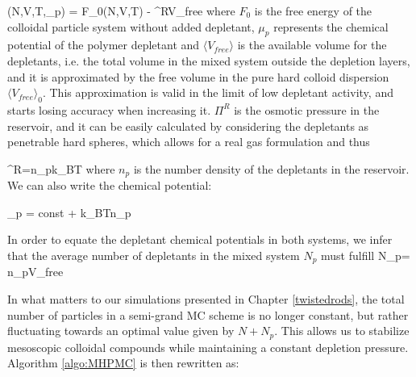 \beq
\Omega(N,V,T,\mu_p) = F_0(N,V,T) - \Pi^R\langle V_{free} \rangle
\eeq
where $F_0$ is the free energy of the colloidal particle system without added depletant, $\mu_p$ represents the chemical potential of the polymer depletant and $\langle V_{free} \rangle$ is the available volume for the depletants, i.e. the total volume in the mixed system outside the depletion layers, and it is approximated by the free volume in the pure hard colloid dispersion $\langle V_{free} \rangle_0$. This approximation is valid in the limit of low depletant activity, and starts losing accuracy when increasing it. $\Pi^R$ is the osmotic pressure in the reservoir, and it can be easily calculated by considering the depletants as penetrable hard spheres, which allows for a real gas formulation and thus

\beq
\Pi^R=n_pk_BT
\eeq
where $n_p$ is the number density of the depletants in the reservoir. We can also write the chemical potential:

\beq
\mu_p = \textrm{const} + k_BT\ln n_p
\eeq

In order to equate the depletant chemical potentials in both systems, we infer that the average number of depletants in the mixed system $N_p$ must fulfill
\beq
N_p= n_p\langle V_{free} \rangle
\eeq

In what matters to our simulations presented in Chapter \ref{twistedrods}, the total number of particles in a semi-grand MC scheme is no longer constant, but rather fluctuating towards an optimal value given by $N + N_p$. This allows us to stabilize mesoscopic colloidal compounds while maintaining a constant depletion pressure. Algorithm \ref{algo:MHPMC} is then rewritten as:

